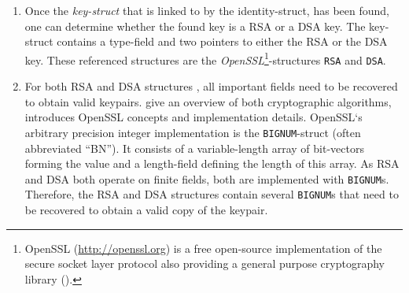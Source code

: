 \begin{enumerate}
	\item Once the \emph{key-struct} %
	that is linked to by the identity-struct, has been found, one can determine
	whether the found key is a RSA or a DSA key.  The key-struct contains a
	type-field and two pointers to either the RSA or the DSA key.  These
	referenced structures are the \emph{OpenSSL}\footnote{OpenSSL
	(\href{http://openssl.org}{http://openssl.org}) is a free open-source
	implementation of the secure socket layer protocol also providing a general
	purpose cryptography library ().}-structures \texttt{RSA} and
	\texttt{DSA}.
	
%

	\item For both RSA and DSA structures %
	, all important fields need to be recovered to obtain valid keypairs.
	\cite{applied_crypto:1996,handbook_applied_crypto:2001} give an overview of
	both cryptographic algorithms, \cite{openssl_book:2002} introduces OpenSSL
	concepts and implementation details. OpenSSL`s arbitrary precision integer
	implementation is the \texttt{BIGNUM}-struct (often abbreviated ``BN'').  It
	consists of a variable-length array of bit-vectors forming the value and a
	length-field defining the length of this array. %
	As RSA and DSA both operate on finite fields, both are implemented with
	\texttt{BIGNUM}s.  Therefore, the RSA and DSA structures contain several
	\texttt{BIGNUM}s that need to be recovered to obtain a valid copy of the
	keypair.
	

\end{enumerate}
